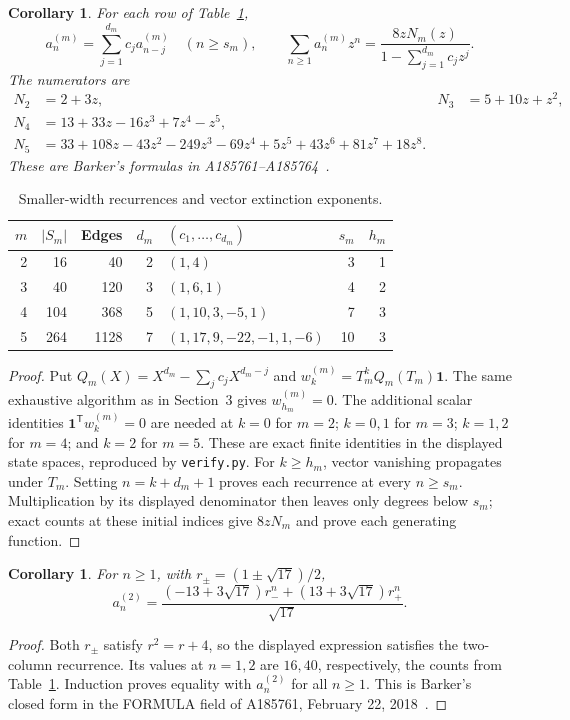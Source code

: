 \documentclass[11pt]{article}
\newtheorem{corollary}[theorem]{Corollary}
\begin{document}
\begin{corollary}\label{cor:siblings}
For each row of Table~\ref{tab:siblings},
\[
 a^{(m)}_n=\sum_{j=1}^{d_m}c_j a^{(m)}_{n-j}\quad(n\geq s_m),
 \qquad
 \sum_{n\geq1}a^{(m)}_nz^n=\frac{8zN_m(z)}{1-\sum_{j=1}^{d_m}c_jz^j}.
\]
The numerators are
\begin{align*}
 N_2&=2+3z, &N_3&=5+10z+z^2,\\
 N_4&=13+33z-16z^3+7z^4-z^5,\\
 N_5&=33+108z-43z^2-249z^3-69z^4+5z^5+43z^6+81z^7+18z^8.
\end{align*}
These are Barker's formulas in A185761--A185764~\cite{hardin761,hardin762,hardin763,hardin764}.
\end{corollary}
\begin{table}[ht]
\centering\small
\begin{tabular}{rrrrlrr}
\toprule
$m$ & $|S_m|$ & Edges & $d_m$ & $(c_1,\ldots,c_{d_m})$ & $s_m$ & $h_m$\\
\midrule
2 & 16 & 40 & 2 & $(1,4)$ & 3 & 1\\
3 & 40 & 120 & 3 & $(1,6,1)$ & 4 & 2\\
4 & 104 & 368 & 5 & $(1,10,3,-5,1)$ & 7 & 3\\
5 & 264 & 1128 & 7 & $(1,17,9,-22,-1,1,-6)$ & 10 & 3\\
\bottomrule
\end{tabular}
\caption{Smaller-width recurrences and vector extinction exponents.}\label{tab:siblings}
\end{table}
\begin{proof}
Put $Q_m(X)=X^{d_m}-\sum_jc_jX^{d_m-j}$ and
$w^{(m)}_k=T_m^kQ_m(T_m)\mathbf1$.
The same exhaustive algorithm as in Section~3 gives
$w^{(m)}_{h_m}=0$. The additional scalar identities
$\mathbf1^{\mathsf T}w^{(m)}_k=0$ are needed at
$k=0$ for $m=2$; $k=0,1$ for $m=3$; $k=1,2$ for $m=4$; and $k=2$
for $m=5$. These are exact finite identities in the displayed state spaces,
reproduced by \texttt{verify.py}. For $k\geq h_m$, vector vanishing
propagates under $T_m$. Setting $n=k+d_m+1$ proves each recurrence
at every $n\geq s_m$. Multiplication by its displayed denominator then
leaves only degrees below $s_m$; exact counts at these initial indices
give $8zN_m$ and prove each generating function.
\end{proof}

\begin{corollary}\label{cor:closed}
For $n\geq1$, with $r_\pm=(1\pm\sqrt{17})/2$,
\[
 a^{(2)}_n=
 \frac{(-13+3\sqrt{17})r_-^n+(13+3\sqrt{17})r_+^n}{\sqrt{17}}.
\]
\end{corollary}
\begin{proof}
Both $r_\pm$ satisfy $r^2=r+4$, so the displayed expression satisfies
the two-column recurrence. Its values at $n=1,2$ are $16,40$, respectively,
the counts from Table~\ref{tab:siblings}. Induction proves equality
with $a^{(2)}_n$ for all $n\geq1$. This is Barker's closed form in
the FORMULA field of A185761, February 22, 2018~\cite{hardin761}.
\end{proof}
\end{document}
